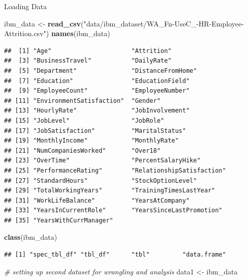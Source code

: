 \documentclass[
]{article}
\newenvironment{Shaded}{\begin{snugshade}}{\end{snugshade}}
\newcommand{\CommentTok}[1]{\textcolor[rgb]{0.56,0.35,0.01}{\textit{#1}}}
\newcommand{\KeywordTok}[1]{\textcolor[rgb]{0.13,0.29,0.53}{\textbf{#1}}}
\newcommand{\NormalTok}[1]{#1}
\newcommand{\StringTok}[1]{\textcolor[rgb]{0.31,0.60,0.02}{#1}}
\begin{document}
Loading Data

\begin{Shaded}
\begin{Highlighting}[]
\NormalTok{ibm_data <-}\StringTok{ }\KeywordTok{read_csv}\NormalTok{(}\StringTok{"data/ibm_dataset/WA_Fn-UseC_-HR-Employee-Attrition.csv"}\NormalTok{)}
\KeywordTok{names}\NormalTok{(ibm_data)}
\end{Highlighting}
\end{Shaded}

\begin{verbatim}
##  [1] "Age"                      "Attrition"               
##  [3] "BusinessTravel"           "DailyRate"               
##  [5] "Department"               "DistanceFromHome"        
##  [7] "Education"                "EducationField"          
##  [9] "EmployeeCount"            "EmployeeNumber"          
## [11] "EnvironmentSatisfaction"  "Gender"                  
## [13] "HourlyRate"               "JobInvolvement"          
## [15] "JobLevel"                 "JobRole"                 
## [17] "JobSatisfaction"          "MaritalStatus"           
## [19] "MonthlyIncome"            "MonthlyRate"             
## [21] "NumCompaniesWorked"       "Over18"                  
## [23] "OverTime"                 "PercentSalaryHike"       
## [25] "PerformanceRating"        "RelationshipSatisfaction"
## [27] "StandardHours"            "StockOptionLevel"        
## [29] "TotalWorkingYears"        "TrainingTimesLastYear"   
## [31] "WorkLifeBalance"          "YearsAtCompany"          
## [33] "YearsInCurrentRole"       "YearsSinceLastPromotion" 
## [35] "YearsWithCurrManager"
\end{verbatim}

\begin{Shaded}
\begin{Highlighting}[]
\KeywordTok{class}\NormalTok{(ibm_data)}
\end{Highlighting}
\end{Shaded}

\begin{verbatim}
## [1] "spec_tbl_df" "tbl_df"      "tbl"         "data.frame"
\end{verbatim}

\begin{Shaded}
\begin{Highlighting}[]
\CommentTok{# setting up second dataset for wrangling and analysis}
\NormalTok{data1 <-}\StringTok{ }\NormalTok{ibm_data }
\end{Highlighting}
\end{Shaded}
\end{document}
